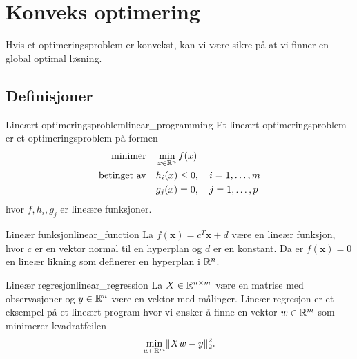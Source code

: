 
\chapter{Konveks optimering}

Hvis et optimeringsproblem er konvekst, kan vi være sikre på at vi finner en global optimal løsning.

\section*{Definisjoner}

\begin{definition}{Lineært optimeringsproblem}{linear_programming}
  Et lineært optimeringsproblem er et optimeringsproblem på formen
  \begin{align*}
    \text{minimer}     & \quad \min_{x \in \mathbb{R}^n} f(x)                \\
    \text{betinget av} & \quad h_i(x) \leq 0, \quad i = 1, \ldots, m \\
                       & \quad g_j(x) = 0, \quad j = 1, \ldots, p
  \end{align*}
  hvor \(f, h_i, g_j\) er lineære funksjoner.
\end{definition}

\begin{example}{Lineær funksjon}{linear_function}
  La \(f(\symbf{x}) = c^T\symbf{x} + d\) være en lineær funksjon, hvor \(c\) er en vektor normal til en hyperplan og \(d\) er en konstant.
  Da er \(f(\symbf{x}) = 0\) en lineær likning som definerer en hyperplan i \(\mathbb{R}^n\).
\end{example}

\begin{example}{Lineær regresjon}{linear_regression}
  La \(X \in \mathbb{R}^{n \times m}\) være en matrise med observasjoner og \(y \in \mathbb{R}^n\) være en vektor med målinger.
  Lineær regresjon er et eksempel på et lineært program hvor vi ønsker å finne en vektor \(w \in \mathbb{R}^m\) som minimerer kvadratfeilen
  \begin{equation*}
    \min_{w \in \mathbb{R}^m} \lVert Xw - y\rVert_2^2.
  \end{equation*}
\end{example}
